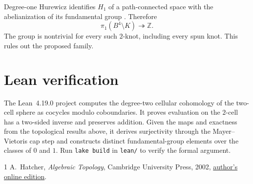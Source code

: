 \documentclass[10pt]{article}
\begin{document}
Degree-one Hurewicz identifies \(H_1\) of a path-connected space
with the abelianization of its fundamental group
\cite[Theorem~2A.1]{hatcher}. Therefore
\[
   \pi_1(B^4\setminus K)\twoheadrightarrow \mathbb Z .
\]
The group is nontrivial for every such \(2\)-knot, including every
spun knot. This rules out the proposed family.

\section*{Lean verification}

The Lean~4.19.0 project computes the degree-two cellular cohomology
of the two-cell sphere as cocycles modulo coboundaries. It proves
evaluation on the \(2\)-cell has a two-sided inverse and preserves
addition.
Given the maps and exactness from the topological results above,
it derives surjectivity through the Mayer--Vietoris cap step and
constructs distinct fundamental-group elements over the classes
of \(0\) and \(1\). Run \verb|lake build| in \verb|lean/|
to verify the formal argument.

\begin{thebibliography}{1}
A.~Hatcher, \emph{Algebraic Topology}, Cambridge University Press, 2002,
\href{https://pi.math.cornell.edu/~hatcher/AT/AT.pdf}{author's online edition}.
\end{thebibliography}
\end{document}
